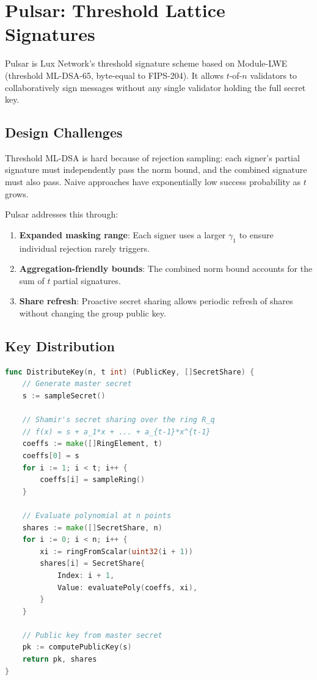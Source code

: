 \section{Pulsar: Threshold Lattice Signatures}


Pulsar is Lux Network's threshold signature scheme based on Module-LWE
(threshold ML-DSA-65, byte-equal to FIPS-204). It allows
$t$-of-$n$ validators to collaboratively sign messages without any single validator
holding the full secret key.

\subsection{Design Challenges}

Threshold ML-DSA is hard because of rejection sampling: each signer's partial
signature must independently pass the norm bound, and the combined signature must also
pass. Naive approaches have exponentially low success probability as $t$ grows.

Pulsar addresses this through:
\begin{enumerate}[nosep]
  \item \textbf{Expanded masking range}: Each signer uses a larger $\gamma_1$ to ensure
    individual rejection rarely triggers.
  \item \textbf{Aggregation-friendly bounds}: The combined norm bound accounts for the sum
    of $t$ partial signatures.
  \item \textbf{Share refresh}: Proactive secret sharing allows periodic refresh of shares
    without changing the group public key.
\end{enumerate}

\subsection{Key Distribution}

\begin{lstlisting}[language=Go,caption={Pulsar key generation via Shamir's secret sharing over $R_q$}]
func DistributeKey(n, t int) (PublicKey, []SecretShare) {
    // Generate master secret
    s := sampleSecret()

    // Shamir's secret sharing over the ring R_q
    // f(x) = s + a_1*x + ... + a_{t-1}*x^{t-1}
    coeffs := make([]RingElement, t)
    coeffs[0] = s
    for i := 1; i < t; i++ {
        coeffs[i] = sampleRing()
    }

    // Evaluate polynomial at n points
    shares := make([]SecretShare, n)
    for i := 0; i < n; i++ {
        xi := ringFromScalar(uint32(i + 1))
        shares[i] = SecretShare{
            Index: i + 1,
            Value: evaluatePoly(coeffs, xi),
        }
    }

    // Public key from master secret
    pk := computePublicKey(s)
    return pk, shares
}
\end{lstlisting}

